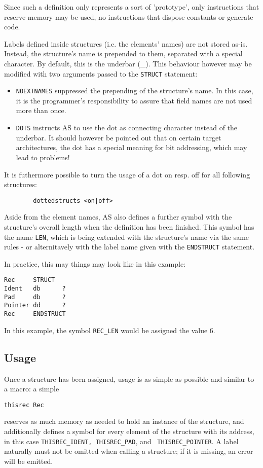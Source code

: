 \documentclass[12pt,twoside]{report}
\newcommand{\tty}[1]{{\tt #1}}
\begin{document}
Since such a definition only represents a sort of 'prototype', only
instructions that reserve memory may be used, no instructions that dispose
constants or generate code.

Labels defined inside structures (i.e. the elements' names) are not
stored as-is.  Instead, the structure's name is prepended to them,
separated with a special character.  By default, this is the underbar
(\_).  This behaviour however may be modified with two arguments passed
to the
\tty{STRUCT} statement:
\begin{itemize}
\item{\tty{NOEXTNAMES} suppressed the prepending of the structure's name.
      In this case, it is the programmer's responsibility to assure that
      field names are not used more than once.}
\item{\tty{DOTS} instructs AS to use the dot as connecting character
      instead of the underbar.  It should however be pointed out that
      on certain target architectures, the dot has a special meaning
      for bit addressing, which may lead to problems!}
\end{itemize}
It is futhermore possible to turn the usage of a dot on resp. off for all
following structures:
\begin{verbatim}
        dottedstructs <on|off>
\end{verbatim}

Aside from the element names, AS also defines a further symbol with the
structure's overall length when the definition has been finished.  This
symbol has the name {\tt LEN}, which is being extended with the
structure's name via the same rules - or alternitavely with the label name
given with the \tty{ENDSTRUCT} statement.

In practice, this may things may look like in this example:
\begin{verbatim}
Rec     STRUCT  
Ident   db      ?
Pad     db      ?
Pointer dd      ?
Rec     ENDSTRUCT
\end{verbatim}   
In this example, the symbol {\tt REC\_LEN} would be assigned the value 6.

\subsection{Usage}

Once a structure has been assigned, usage is as simple as possible and
similar to a macro: a simple
\begin{verbatim}
thisrec Rec
\end{verbatim}
reserves as much memory as needed to hold an instance of the structure,
and additionally defines a symbol for every element of the structure with
its address, in this case {\tt THISREC\_IDENT, THISREC\_PAD}, and {\tt
THISREC\_POINTER}.  A label naturally must not be omitted when calling a
structure; if it is missing, an error will be emitted.
\end{document}
